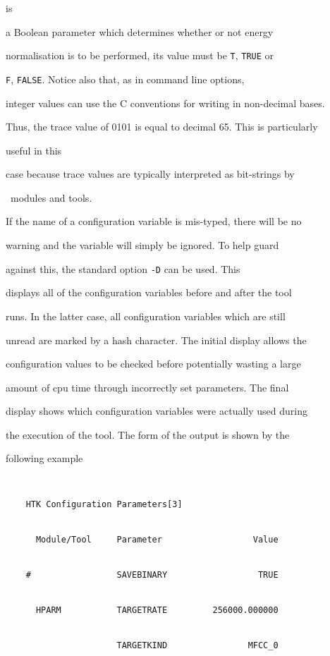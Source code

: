  is


a Boolean parameter  which determines whether or not energy


normalisation is to be performed, its value must be \texttt{T}, \texttt{TRUE} or


\texttt{F}, \texttt{FALSE}.  Notice also that, as in command line options,


integer values can use the C conventions for writing in non-decimal bases.


Thus, the trace value of 0101 is equal to decimal 65.  This is particularly


useful in this


case because trace values are typically interpreted as bit-strings by


\HTK\ modules and tools.





If the name of a configuration variable is mis-typed, there will be no


warning and the variable will simply be ignored.  To help guard


against this, the standard option \texttt{-D} can be used.  This


displays all of the configuration variables before and after the tool


runs.  In the latter case, all configuration variables which are still


unread are marked by a hash character.  The initial display allows the


configuration values to be checked before potentially wasting a large


amount of cpu time through incorrectly set parameters.  The final


display shows which configuration variables were actually used during


the execution of the tool.  The form of the output is shown by the


following example


\begin{verbatim}


    HTK Configuration Parameters[3]


      Module/Tool     Parameter                  Value


    #                 SAVEBINARY                  TRUE


      HPARM           TARGETRATE         256000.000000


                      TARGETKIND                MFCC_0


\end{verbatim}


